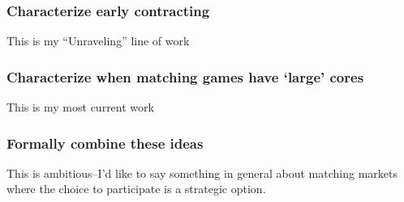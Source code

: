 \documentclass{beamer}
\begin{document}
\subsubsection{Characterize early contracting}
\begin{frame}
	This is my ``Unraveling'' line of work
\end{frame}

\subsubsection{Characterize when matching games have `large' cores}
\begin{frame}
	This is my  most current work
\end{frame}

\subsubsection{Formally combine these ideas}
\begin{frame}
	This is ambitious--I'd like to say something in general about matching markets where the choice to participate is a strategic option.  
\end{frame}
\end{document}
